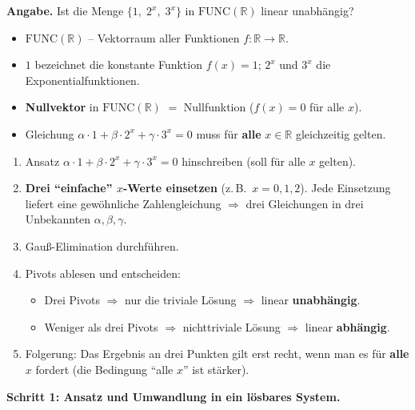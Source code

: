 \documentclass[a4paper,12pt]{article}
\begin{document}
\textbf{Angabe.} Ist die Menge $\{1,\; 2^x,\; 3^x\}$ in $\text{FUNC}(\mathbb{R})$ linear unabh\"angig?

\begin{begriffe}
\begin{itemize}[leftmargin=*, nosep]
    \item $\text{FUNC}(\mathbb{R})$ -- Vektorraum aller Funktionen $f : \mathbb{R} \to \mathbb{R}$.
    \item $1$ bezeichnet die konstante Funktion $f(x) = 1$; $2^x$ und $3^x$ die Exponentialfunktionen.
    \item \textbf{Nullvektor} in $\text{FUNC}(\mathbb{R})$ $=$ Nullfunktion ($f(x) = 0$ f\"ur alle $x$).
    \item Gleichung $\alpha \cdot 1 + \beta \cdot 2^x + \gamma \cdot 3^x = 0$ muss f\"ur \textbf{alle} $x \in \mathbb{R}$ gleichzeitig gelten.
\end{itemize}
\end{begriffe}

\begin{wastun}
\begin{enumerate}[leftmargin=*, nosep]
    \item Ansatz $\alpha \cdot 1 + \beta \cdot 2^x + \gamma \cdot 3^x = 0$ hinschreiben (soll f\"ur alle $x$ gelten).
    \item \textbf{Drei ``einfache'' $x$-Werte einsetzen} (z.\,B.\ $x = 0, 1, 2$). Jede Einsetzung liefert eine gew\"ohnliche Zahlengleichung $\Rightarrow$ drei Gleichungen in drei Unbekannten $\alpha, \beta, \gamma$.
    \item Gau\ss-Elimination durchf\"uhren.
    \item Pivots ablesen und entscheiden:
    \begin{itemize}[nosep]
        \item Drei Pivots $\Rightarrow$ nur die triviale L\"osung $\Rightarrow$ linear \textbf{unabh\"angig}.
        \item Weniger als drei Pivots $\Rightarrow$ nichttriviale L\"osung $\Rightarrow$ linear \textbf{abh\"angig}.
    \end{itemize}
    \item Folgerung: Das Ergebnis an drei Punkten gilt erst recht, wenn man es f\"ur \textbf{alle} $x$ fordert (die Bedingung ``alle $x$'' ist st\"arker).
\end{enumerate}
\end{wastun}

\medskip

\textbf{Schritt 1: Ansatz und Umwandlung in ein l\"osbares System.}
\end{document}
